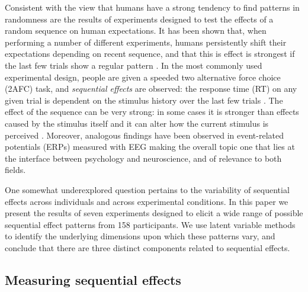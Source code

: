 \documentclass{apa}[12pt]
\begin{document}
Consistent with the view that humans have a strong tendency to find patterns in randomness are the results of experiments designed to test the effects of a random sequence on human expectations. It has been shown that, when performing a number of different experiments, humans persistently shift their expectations depending on recent sequence, and that this is effect is strongest if the last few trials show a regular pattern \cite{Fernberger20,Jarvik51,Bertelson61,Squires76,Maloney05}. In the most commonly used experimental design, people are given a speeded two alternative force choice (2AFC) task, and {\it sequential effects} are observed: the response time (RT) on any given trial is dependent on the stimulus history over the last few trials \cite{Bertelson61,Falmagne65,Hale67,Laming68,Hale69,Remington69,Schvaneveldt69,Laming69,Kirby72,Kirby76,Soetens85,Cho02,Jentzsch02}. The effect of the sequence can be very strong: in some cases it is stronger than effects caused by the stimulus itself \cite{Kornblum69} and it can alter how the current stimulus is perceived \cite{Maloney05}. Moreover, analogous findings have been observed in event-related potentials (ERPs) measured with EEG \cite{Squires76,Sommer90,Sommer99,Jentzsch02} making the overall topic one that lies at the interface between psychology and neuroscience, and of relevance to both fields.

One somewhat underexplored question pertains to the variability of sequential effects across individuals and across experimental conditions. In this paper we present the results of seven experiments designed to elicit a wide range of possible sequential effect patterns from 158 participants. We use latent variable methods to identify the underlying dimensions upon which these patterns vary, and conclude that there are three distinct components related to sequential effects.

\subsection{Measuring sequential effects}
\end{document}
